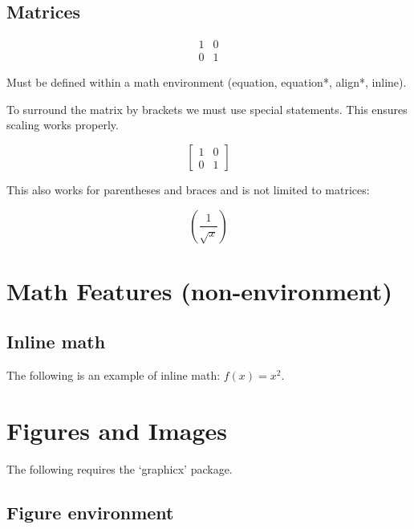 \documentclass{article}
\begin{document}
\subsection{Matrices}

\begin{equation*}
	\begin{matrix}
		1 & 0\\
		0 & 1
	\end{matrix}
\end{equation*}

Must be defined within a math environment (equation, equation*, align*, inline).

To surround the matrix by brackets we must use special statements. This ensures scaling works properly.

\begin{equation*}
	\left[
	\begin{matrix}
		1 & 0\\
		0 & 1
	\end{matrix}
	\right]
\end{equation*}

This also works for parentheses and braces and is not limited to matrices:

\begin{equation*}
	\left(\frac{1}{\sqrt{x}}\right)
\end{equation*}

\section{Math Features (non-environment)}

\subsection{Inline math}
The following is an example of inline math: $f(x) = x^2$.

\section{Figures and Images}

The following requires the `graphicx' package.

\subsection{Figure environment}
\end{document}
